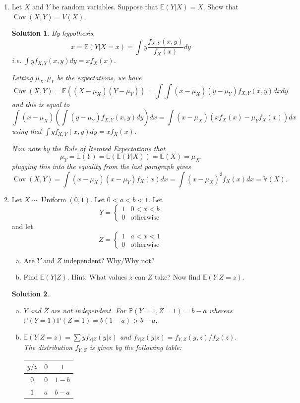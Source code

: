 \documentclass[10pt]{article}
\newtheorem*{sol}{Solution}
\renewcommand{\P}{\mathbb{P}}
\newcommand{\V}{\mathbb{V}}
\newcommand{\E}{\mathbb{E}}
\newcommand{\Unif}{\operatorname{Uniform}}
\newcommand{\Cov}{\operatorname{Cov}}
\begin{document}
\begin{enumerate}
\item[(21)]
Let $X$ and $Y$ be random variables. Suppose that $\E(Y|X) = X$. Show
that $\Cov(X, Y) = V(X)$.

\begin{sol}
By hypothesis,
\[
x = \E(Y | X=x) = \int y \frac{f_{X,Y}(x,y)}{f_X(x)}dy
\]
i.e. $\int y f_{X,Y}(x,y)dy = x f_X(x)$.

Letting $\mu_X,\mu_Y$ be the expectations, we have
\[
\Cov(X,Y) = \E((X-\mu_X)(Y-\mu_Y)) =
\int \int (x-\mu_X)(y-\mu_Y)f_{X,Y}(x,y)dxdy
\]
and this is equal to
\[
\int (x-\mu_X)\left(\int (y-\mu_Y) f_{X,Y}(x,y)dy\right)dx
= \int (x-\mu_X) \left(xf_X(x) - \mu_Yf_X(x)\right)dx
\]
using that $\int y f_{X,Y}(x,y)dy = x f_X(x)$.

Now note by the Rule of Iterated Expectations that
\[
\mu_Y = \E(Y) = \E(\E(Y|X)) = \E(X) = \mu_X.
\]
plugging this into the equality from the last paragraph gives
\[
\Cov(X,Y) = \int (x-\mu_X)(x-\mu_Y)f_X(x)dx = \int(x-\mu_X)^2 f_X(x)dx=\V(X).
\]
\end{sol}

\item[(22)]
Let $X \sim \Unif(0,1)$. Let $0 < a < b < 1$. Let
\[
Y =
\begin{cases}
1 & 0<x<b \\
0 & \text{otherwise}
\end{cases}
\]
and let
\[Z =
\begin{cases}
1 & a < x < 1 \\
0 & \text{otherwise}
\end{cases}
\]
\begin{enumerate}[(a)]
\item Are $Y$ and $Z$ independent? Why/Why not?
\item Find $\E(Y|Z)$. Hint: What values $z$ can $Z$ take?
Now find $\E(Y|Z=z)$.
\end{enumerate}

\begin{sol}
\begin{enumerate}[(a)]
\item $Y$ and $Z$ are not independent. For $\P(Y=1,Z=1)=b-a$ whereas
$\P(Y=1)\P(Z=1) = b(1-a) > b-a$.
\item $\E(Y|Z=z) = \sum y f_{Y|Z}(y|z)$ and $f_{Y|Z}(y|z) = f_{Y,Z}(y,z)/f_Z(z)$.
The distribution $f_{Y,Z}$ is given by the following table:
\begin{center}
\begin{tabular}{c | c | c}
$y/z$ & $0$ & $1$ \\
\hline
$0$ & $0$ & $1-b$ \\
\hline
$1$ & $a$ & $b-a$
\end{tabular}
\end{center}


\end{enumerate}
\end{sol}
\end{enumerate}
\end{document}
